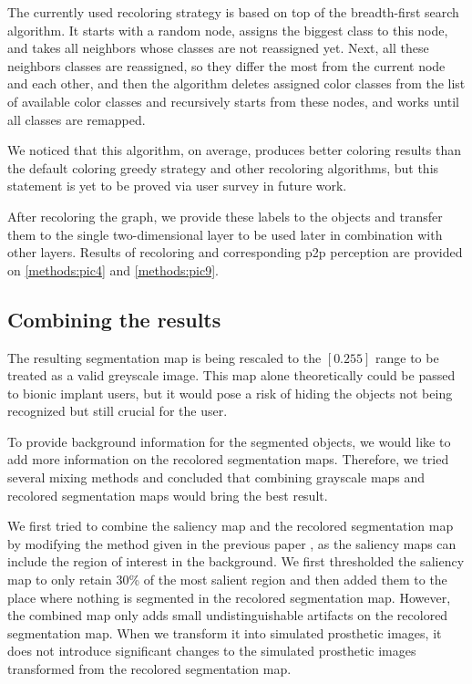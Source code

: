 The currently used recoloring strategy is based on top of the breadth-first search algorithm. It starts with a random node, assigns the biggest class to this node, and takes all neighbors whose classes are not reassigned yet. Next, all these neighbors classes are reassigned, so they differ the most from the current node and each other, and then the algorithm deletes assigned color classes from the list of available color classes and recursively starts from these nodes, and works until all classes are remapped.

We noticed that this algorithm, on average, produces better coloring results than the default coloring greedy strategy and other recoloring algorithms, but this statement is yet to be proved via user survey in future work.

After recoloring the graph, we provide these labels to the objects and transfer them to the single two-dimensional layer to be used later in combination with other layers. Results of recoloring and corresponding p2p perception are provided on \autoref{methods:pic4} and \autoref{methods:pic9}.

\subsection{Combining the results}
\label{methods:combining}

The resulting segmentation map is being rescaled to the $[0.255]$ range to be treated as a valid greyscale image. This map alone theoretically could be passed to bionic implant users, but it would pose a risk of hiding the objects not being recognized but still crucial for the user.

To provide background information for the segmented objects, we would like to add more information on the recolored segmentation maps. Therefore, we tried several mixing methods and concluded that combining grayscale maps and recolored segmentation maps would bring the best result.

We first tried to combine the saliency map and the recolored segmentation map by modifying the method given in the previous paper \cite{han2021deep}, as the saliency maps can include the region of interest in the background. We first thresholded the saliency map to only retain 30\% of the most salient region and then added them to the place where nothing is segmented in the recolored segmentation map. However, the combined map only adds small undistinguishable artifacts on the recolored segmentation map. When we transform it into simulated prosthetic images, it does not introduce significant changes to the simulated prosthetic images transformed from the recolored segmentation map.

